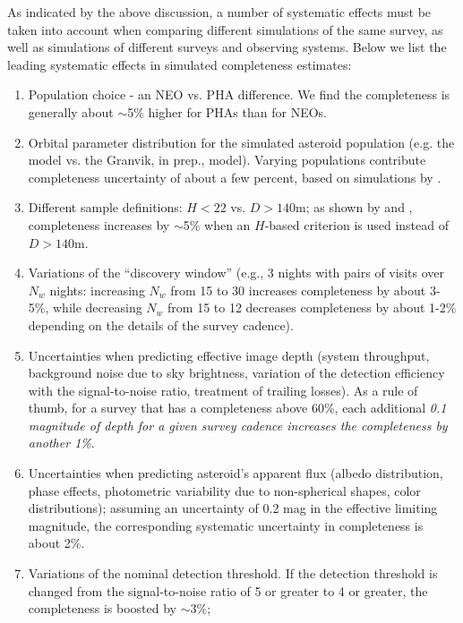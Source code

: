 As indicated by the above discussion, a number of systematic effects must be taken into account when
comparing different simulations of the same survey, as well as simulations of different surveys and observing
systems. Below we list the leading systematic effects in simulated completeness estimates:
\begin{enumerate}
\item Population choice - an NEO vs. PHA difference. We find the completeness is generally about $\sim$5\% higher for PHAs than for NEOs.
\item Orbital parameter distribution for the simulated asteroid population (e.g. the \citealt{Bottke2002} model
             vs. the Granvik, in prep., model). Varying populations contribute completeness uncertainty of about a few percent, based
             on simulations by \citet{VeresChesley2017neo}.
\item Different sample definitions: $H<22$ vs. $D>140$m; as shown by  \citet{2016AJ....152...79W} and \citealt{GMS2016},
          completeness increases by $\sim$5\% when an $H$-based criterion is used instead of $D>140$m.
\item Variations of the ``discovery window'' (e.g., 3 nights with pairs of visits over $N_w$ nights: increasing
        $N_w$ from 15 to 30 increases completeness by about 3-5\%, while decreasing $N_w$ from 15 to 12 decreases 
        completeness by about 1-2\% depending on the details of the survey cadence).
\item Uncertainties when predicting effective image depth (system throughput, background noise due to sky brightness, 
          variation of the detection efficiency with the signal-to-noise ratio, treatment of trailing losses). As a rule of thumb, for a survey that has a 
          completeness above 60\%, each additional {\it 0.1 magnitude of depth for a given survey cadence increases the 
          completeness by another 1\%}.
\item Uncertainties when predicting asteroid's apparent flux (albedo distribution, phase effects, photometric variability
          due to non-spherical shapes, color distributions); assuming an uncertainty of 0.2 mag in the effective
          limiting magnitude, the corresponding  systematic uncertainty in completeness is about 2\%.
\item Variations of the nominal detection threshold. If the detection threshold is changed from the
          signal-to-noise ratio of 5 or greater to 4 or greater, the completeness is boosted by $\sim$3\%;

\end{enumerate}

